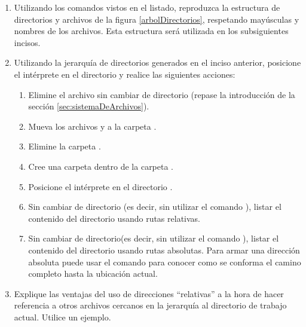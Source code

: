 \documentclass[12pt]{article}
\begin{document}
\begin{enumerate}[resume]
        Puede verificar que su esquema es correcto ejecutando el comando
        .

    \item Utilizando los comandos vistos en el listado, reproduzca la
        estructura de directorios y archivos de la figura
        \ref{arbolDirectorios}, respetando mayúsculas y nombres de los
        archivos. Esta estructura será utilizada en los subsiguientes incisos.

    \item Utilizando la jerarquía de directorios generados en el inciso
        anterior, posicione el intérprete en el directorio  y
        realice las siguientes acciones:

    \begin{enumerate}

        \item Elimine el archivo  sin cambiar de directorio
            (repase la introducción de la sección
            \ref{sec:sistemaDeArchivos}).

        \item Mueva los archivos  y  a la carpeta
            .

        \item Elimine la carpeta .

        \item Cree una carpeta  dentro de la carpeta .

        \item Posicione el intérprete en el directorio .

        \item Sin cambiar de directorio (es decir, sin utilizar el comando
            ), listar el contenido del directorio  usando
            rutas relativas.

        \item Sin cambiar de directorio(es decir, sin utilizar el comando
            ), listar el contenido del directorio  usando
            rutas absolutas. Para armar una dirección absoluta puede usar el
            comando  para conocer como se conforma el camino completo
            hasta la ubicación actual.

    \end{enumerate}

    \item Explique las ventajas del uso de direcciones ``relativas'' a la
            hora de hacer referencia a otros archivos cercanos en la jerarquía
            al directorio de trabajo actual. Utilice un ejemplo.


\end{enumerate}
\end{document}
